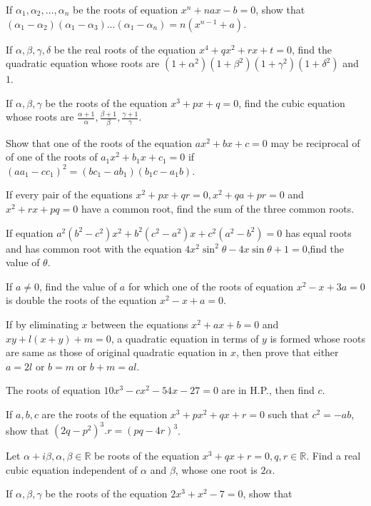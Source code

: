 \item If $\alpha_1, \alpha_2, \ldots, \alpha_n$ be the roots of equation $x^n + nax - b = 0$, show that $(\alpha_1 -
  \alpha_2)(\alpha_1 - \alpha_3)\ldots (\alpha_1 - \alpha_n) = n(x^{n - 1} + a)$.
\item If $\alpha, \beta, \gamma, \delta$ be the real roots of the equation $x^4 + qx^2 + rx + t = 0$, find the quadratic equation
  whose roots are $(1 + \alpha^2)(1 + \beta^2)(1 + \gamma^2)(1 +\delta^2)$ and $1$.
\item If $\alpha, \beta, \gamma$ be the roots of the equation $x^3 + px + q = 0$, find the cubic equation whose roots are
  $\frac{\alpha + 1}{\alpha}, \frac{\beta + 1}{\beta}, \frac{\gamma + 1}{\gamma}$.
\item Show that one of the roots of the equation $ax^2 + bx + c = 0$ may be reciprocal of of one of the roots of $a_1x^2 + b_1x +
  c_1 = 0$ if $(aa_1 - cc_1)^2 = (bc_1 - ab_1)(b_1c - a_1b)$.
\item If every pair of the equations $x^2 + px + qr = 0, x^2 + qa + pr = 0$ and $x^2 + rx + pq = 0$ have a common root, find the
  sum of the three common roots.
\item If equation $a^2(b^2 - c^2)x^2 + b^2(c^2 - a^2)x + c^2(a^2 - b^2) = 0$ has equal roots and has common
  root with the equation $4x^2\sin^2\theta - 4x\sin\theta + 1 = 0$,find the value of $\theta$.
\item If $a\neq 0$, find the value of $a$ for which one of the roots of equation $x^2 - x + 3a= 0$ is double the roots of the
  equation $x^2 - x + a = 0$.
\item If by eliminating $x$ between the equations $x^2 + ax + b = 0$ and $xy + l(x + y) + m = 0$, a
  quadratic equation in terms of
  $y$ is formed whose roots are same as those of original quadratic equation in $x$, then prove that either $a = 2l$ or $b = m$ or
  $b + m = al$.
\item The roots of equation $10x^3 - cx^2 - 54x - 27 = 0$ are in H.P., then find $c$.
\item If $a, b, c$ are the roots of the equation $x^3 + px^2 + qx + r = 0$ such that $c^2 = -ab$, show that $(2q - p^2)^3.r = (pq -
  4r)^3$.
\item Let $\alpha + i\beta, \alpha, \beta\in\mathbb{R}$ be roots of the equation $x^3 + qx + r = 0, q, r\in\mathbb{R}$. Find a real
  cubic equation independent of $\alpha$ and $\beta$, whose one root is $2\alpha$.
\item If $\alpha, \beta, \gamma$ be the roots of the equation $2x^3 + x^2 - 7 = 0$, show that
